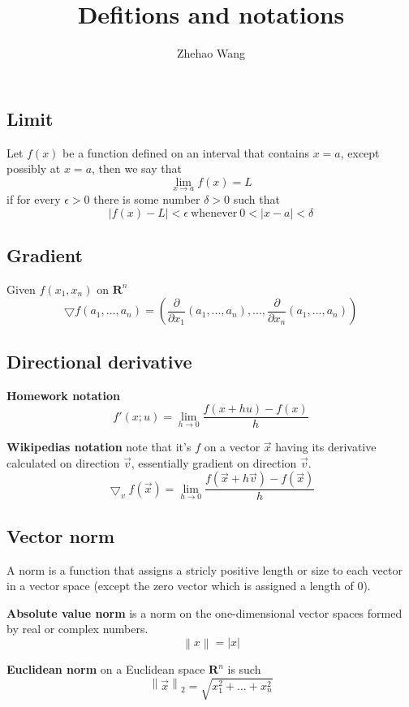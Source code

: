 \documentclass{article}
\newcommand{\norm}[1]{\left\lVert#1\right\rVert}
\begin{document}
\title{Defitions and notations}
\author{Zhehao Wang}

\maketitle{}

\subsection{Limit}

Let $f(x)$ be a function defined on an interval that contains $x = a$, except possibly at $x = a$, then we say that
$$
\lim\limits_{x \to a}{f(x) = L}
$$
if for every $\epsilon > 0$ there is some number $\delta > 0$ such that
$$
|f(x) - L| < \epsilon ~ \text{whenever} ~ 0 < |x - a| < \delta
$$

\subsection{Gradient}
Given $f(x_1, x_n)$ on $\mathbf{R}^n$
$$
\bigtriangledown f(a_1, ..., a_n) = (\frac{\partial}{\partial x_1}(a_1, ..., a_n), ..., \frac{\partial}{\partial x_n}(a_1, ..., a_n))
$$

\subsection{Directional derivative}

\textbf{Homework notation}
$$
f'(x; u) = \lim\limits_{h \to 0}{\frac{f(x + hu) - f(x)}{h}}
$$

\textbf{Wikipedias notation}
note that it's $f$ on a vector $\vec{x}$ having its derivative calculated on direction $\vec{v}$, essentially gradient on direction $\vec{v}$.
$$
\bigtriangledown_v f(\vec{x}) = \lim\limits_{h \to 0}{\frac{f(\vec{x} + h\vec{v}) - f(\vec{x})}{h}}
$$

\subsection{Vector norm}
A norm is a function that assigns a stricly positive length or size to each vector in a vector space (except the zero vector which is assigned a length of 0).

\textbf{Absolute value norm} is a norm on the one-dimensional vector spaces formed by real or complex numbers.
$$
\norm{x} = |x|
$$

\textbf{Euclidean norm} on a Euclidean space $\mathbf{R}^n$ is such
$$
\norm{\vec{x}}_2 = \sqrt{x_1^2 + ... + x_n^2}
$$
\end{document}
